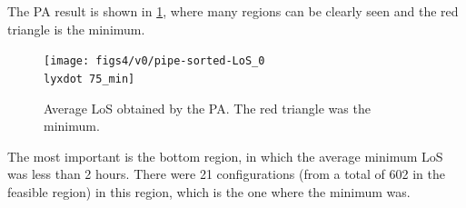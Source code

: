 \documentclass[11pt]{article} %
\begin{document}
The PA result is shown in \ref{subfig:pipe13-1}, where many regions
can be clearly seen and the red triangle is the minimum. 
\begin{figure}[H]
\noindent \begin{centering}
\texttt{[image: figs4/v0/pipe-sorted-LoS\_0\\lyxdot 75\_min]}
\par\end{centering}

\caption{Average LoS obtained by the PA. The red triangle was the minimum.
\label{subfig:pipe13-1}}
\end{figure}
 The most important is the bottom region, in which the average minimum
LoS was less than 2 hours. There were 21 configurations (from a total
of 602 in the feasible region) in this region, which is the one where
the minimum was.
\end{document}
